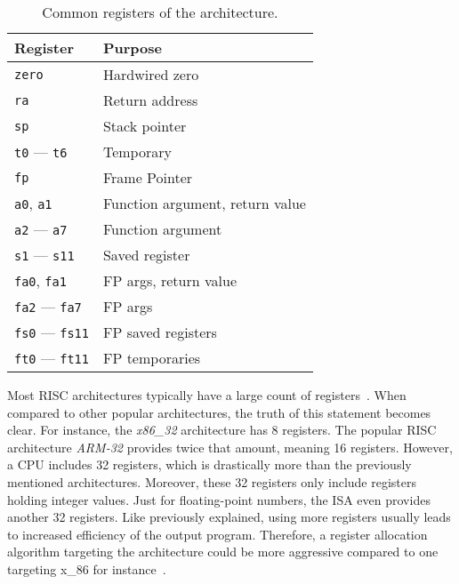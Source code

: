 \begin{wraptable}{r}{.4\textwidth}
	\centering
	\caption{Common registers of the \riscv{} architecture.}{\cite[p.~155]{Waterman2019}}\label{tbl:riscv_regs}
	\begin{tabularx}{\linewidth}{l|L}
		 Register   & Purpose                         \\ \hline
		\texttt{zero}                 & Hardwired zero                  \\ \hline
		\texttt{ra}                   & Return address                  \\ \hline
		\texttt{sp}                   & Stack pointer                   \\ \hline
		\texttt{t0} —  \texttt{t6}    & Temporary                       \\ \hline
		\texttt{fp}                   & Frame Pointer                   \\ \hline
		\texttt{a0}, \texttt{a1}      & Function argument, return value \\ \hline
		\texttt{a2} — \texttt{a7}     & Function argument               \\ \hline
		\texttt{s1} — \texttt{s11}    & Saved register                  \\ \hline
		\texttt{fa0}, \texttt{fa1}    & FP args, return value           \\ \hline
		\texttt{fa2} — \texttt{fa7}   & FP args                         \\ \hline
		\texttt{fs0} — \texttt{fs11}  & FP saved registers              \\ \hline
		\texttt{ft0} —  \texttt{ft11} & FP temporaries                  \\
	\end{tabularx}
\end{wraptable}

Most RISC architectures typically have a large count of registers~\cite[Chapter~2]{Dandamudi2005}.
When compared to other popular architectures, the truth of this statement becomes clear.
For instance, the \emph{x86\_32} architecture has 8 registers.
The popular RISC architecture \emph{ARM-32} provides twice that amount, meaning 16 registers.
However, a \riscv{} CPU includes 32 registers, which is drastically more than the previously mentioned architectures.
Moreover, these 32 registers only include registers holding integer values.
Just for floating-point numbers, the ISA even provides another 32 registers.
Like previously explained, using more registers usually leads to increased efficiency of the output program.
Therefore, a register allocation algorithm targeting the \riscv{} architecture could be more aggressive compared to one targeting x\_86 for instance~\cite[p.~10]{Patterson2017}.

